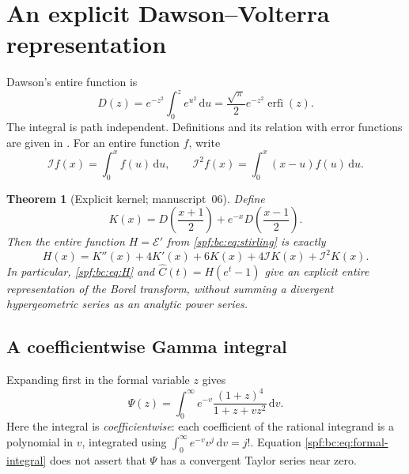 \documentclass[11pt]{article}
\numberwithin{equation}{section}
\newtheorem{theorem}{Theorem}[section]
\theoremstyle{definition}
\theoremstyle{remark}
\theoremstyle{definition}
\newcommand{\bcI}{\mathcal I}
\begin{document}
\section{An explicit Dawson--Volterra representation}
\label{spf:bc:sec:kernel}

Dawson's entire function is
\begin{equation}
 D(z)=e^{-z^2}\int_0^ze^{u^2}\,\mathrm d u
     =\frac{\sqrt\pi}{2}e^{-z^2}\operatorname{erfi}(z).
 \label{spf:bc:eq:dawson}
\end{equation}
The integral is path independent. Definitions and its relation with error
functions are given in \cite{bcDlmfDawson}. For an entire function $f$, write
\begin{equation}
 \bcI f(x)=\int_0^x f(u)\,\mathrm d u,\qquad
 \bcI^2f(x)=\int_0^x(x-u)f(u)\,\mathrm d u.
 \label{spf:bc:eq:volterra}
\end{equation}

\begin{theorem}[Explicit kernel; manuscript~06]
\label{spf:bc:thm:kernel}
Define
\begin{equation}
 K(x)=D\!\left(\frac{x+1}{2}\right)
       +e^{-x}D\!\left(\frac{x-1}{2}\right).
 \label{spf:bc:eq:K}
\end{equation}
Then the entire function $H=\mathcal E'$ from \eqref{spf:bc:eq:stirling} is exactly
\begin{equation}
 \boxed{H(x)=K''(x)+4K'(x)+6K(x)+4\bcI K(x)+\bcI^2K(x).}
 \label{spf:bc:eq:H}
\end{equation}
In particular, \eqref{spf:bc:eq:H} and $\widehat C(t)=H(e^t-1)$ give an explicit entire
representation of the Borel transform, without summing a divergent
hypergeometric series as an analytic power series.
\end{theorem}

\subsection{A coefficientwise Gamma integral}

Expanding first in the formal variable $z$ gives
\begin{equation}
 \Psi(z)=\int_0^\infty e^{-v}
              \frac{(1+z)^4}{1+z+vz^2}\,\mathrm d v.
 \label{spf:bc:eq:formal-integral}
\end{equation}
Here the integral is \emph{coefficientwise}: each coefficient of the rational
integrand is a polynomial in $v$, integrated using
$\int_0^\infty e^{-v}v^j\,\mathrm d v=j!$. Equation
\eqref{spf:bc:eq:formal-integral} does not assert that $\Psi$ has a convergent Taylor
series near zero.
\end{document}
